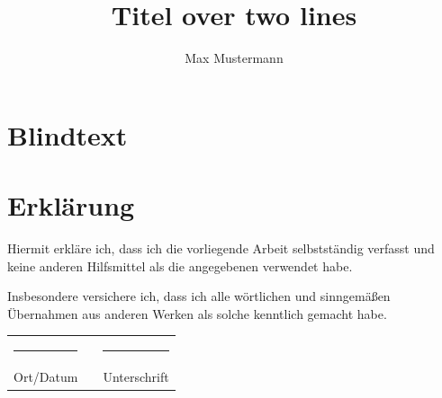 \documentclass[
  11pt,
  bibliography=totoc,
  twoside=semi, %
  ]{scrartcl}
\title{Titel over two \newlineTitle lines}	%
\author{Max Mustermann}	%
\affiliation{
  Matrikelnummer: 123456789\\	%
  Emailaddresse: \url{mustermann@uni-tuebingen.de}\\[1ex]	%
  Studiengang: BSc Neue Ätherwissenschaften \\ %
  Seminar: Seminarname, Universität Tübingen, WS 2021/2022\\ %
  Datum der Fassung: \today, \currenttime
}
\begin{document}
\maketitle
\newpage
\tableofcontents
\newpage



\section{Blindtext}

\lipsum


\insertBib

\newpage

\section*{Erklärung}

Hiermit erkläre ich, dass ich die vorliegende Arbeit selbstständig verfasst und keine anderen Hilfsmittel als die angegebenen verwendet habe.

Insbesondere versichere ich, dass ich alle wörtlichen und sinngemäßen Übernahmen aus anderen Werken als solche kenntlich gemacht habe.

\vspace{10ex}

\noindent
\begin{tabular}{lcl}
  \rule{6cm}{1pt} & \hspace{1cm} & \rule{6cm}{1pt} \\
  Ort/Datum & & Unterschrift
\end{tabular}
\end{document}
